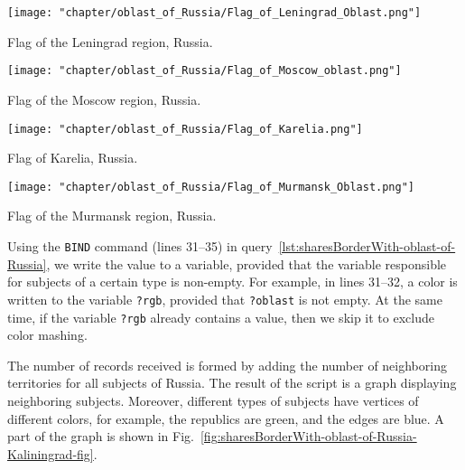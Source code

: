 \begin{marginfigure}[-8.0cm]
{
	\setlength{\fboxsep}{0pt}%
	\setlength{\fboxrule}{1pt}%
	\texttt{[image: "chapter/oblast\_of\_Russia/Flag\_of\_Leningrad\_Oblast.png"]}
}
\caption [Flag of the Leningrad region, Russia.]{Flag of the Leningrad region, Russia.}%
\label{fig:Flag_of_Leningrad_Oblast}%
\end{marginfigure}
\begin{marginfigure}[-4.0cm]
{
	\setlength{\fboxsep}{0pt}%
	\setlength{\fboxrule}{1pt}%
	\texttt{[image: "chapter/oblast\_of\_Russia/Flag\_of\_Moscow\_oblast.png"]}
}
\caption [Flag of the Moscow region, Russia.]{Flag of the Moscow region, Russia.}%
\label{fig:Flag_of_Moscow_oblast}%
\end{marginfigure}
\begin{marginfigure}[0.0cm]
{
	\setlength{\fboxsep}{0pt}%
	\setlength{\fboxrule}{1pt}%
	\texttt{[image: "chapter/oblast\_of\_Russia/Flag\_of\_Karelia.png"]}
}
\caption [Flag of Karelia, Russia.]{Flag of Karelia, Russia.}%
\label{fig:Flag_of_Karelia}%
\end{marginfigure}
\begin{marginfigure}[4.0cm]
{
	\setlength{\fboxsep}{0pt}%
	\setlength{\fboxrule}{1pt}%
	\texttt{[image: "chapter/oblast\_of\_Russia/Flag\_of\_Murmansk\_Oblast.png"]}
}
\caption [Flag of the Murmansk region, Russia.]{Flag of the Murmansk region, Russia.}%
\label{fig:Flag_of_Murmansk_Oblast}%
\end{marginfigure}

Using the \lstinline|BIND| command (lines 31--35) in query~\ref{lst:sharesBorderWith-oblast-of-Russia}, 
we write the value to a variable, provided that the variable 
responsible for subjects of a certain type is non-empty. 
For example, in lines 31--32, a color is written to the variable \lstinline|?rgb|, 
provided that \lstinline|?oblast| is not empty. 
At the same time, if the variable \lstinline|?rgb| already contains a value, then we skip it to exclude color mashing.

The number of records received is formed by adding the number of neighboring territories for all subjects of Russia. The result of the script is a graph displaying neighboring subjects. Moreover, different types of subjects have vertices of different colors, for example, the republics are green, and the edges are blue. A part of the graph is shown in Fig.~\ref{fig:sharesBorderWith-oblast-of-Russia-Kaliningrad-fig}.

